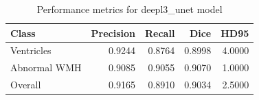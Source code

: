 \begin{table}
\caption{Performance metrics for deepl3_unet model}
\label{tab:deepl3_unet_metrics}
\begin{tabular}{lrrrr}
\toprule
Class & Precision & Recall & Dice & HD95 \\
\midrule
Ventricles & 0.9244 & 0.8764 & 0.8998 & 4.0000 \\
Abnormal WMH & 0.9085 & 0.9055 & 0.9070 & 1.0000 \\
Overall & 0.9165 & 0.8910 & 0.9034 & 2.5000 \\
\bottomrule
\end{tabular}
\end{table}
